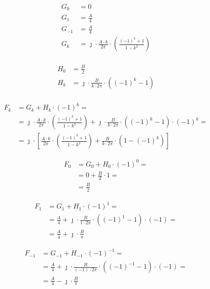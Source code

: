 \begin{task}
\begin{align*}
G_0&=0\\
G_1&=\frac{A}{4}\\
G_{-1}&=\frac{A}{4}\\
G_k&=\jmath \cdot \frac{A \cdot k}{2\pi} \cdot \left( \frac{ (-1)^{k}  + 1}{1 -k^2} \right)\\
\end{align*}

\begin{align*}
H_0&=\frac{B}{2}\\
H_k&=\jmath \cdot \frac{B}{k\cdot 2 \pi}\cdot \left( (-1)^{k} -1 \right)\\
\end{align*}


\begin{align*}
F_k&=G_k+H_k \cdot (-1)^k = \\
&= \jmath \cdot \frac{A \cdot k}{2\pi} \cdot \left( \frac{ (-1)^{k}  + 1}{1 -k^2} \right) + \jmath \cdot \frac{B}{k\cdot 2 \pi}\cdot \left( (-1)^{k} -1 \right) \cdot (-1)^k=\\
&= \jmath \cdot \left[\frac{A \cdot k}{2\pi} \cdot \left( \frac{ (-1)^{k}  + 1}{1 -k^2} \right) + \frac{B}{k\cdot 2 \pi}\cdot \left( 1 - (-1)^{k}\right)\right]
\end{align*}


\begin{align*}
F_0&=G_0 + H_0 \cdot (-1)^0=\\
 &= 0 + \frac{B}{2} \cdot 1=\\
 &= \frac{B}{2}
\end{align*}


\begin{align*}
F_1&=G_1 + H_1 \cdot (-1)^1 =\\
&= \frac{A}{4} + \jmath \cdot \frac{B}{1\cdot 2 \pi}\cdot \left( (-1)^{1} -1 \right) \cdot (-1) =\\
&= \frac{A}{4} + \jmath \cdot \frac{B}{\pi}
\end{align*}

\begin{align*}
F_{-1}&= G_{-1} + H_{-1}\cdot (-1)^{-1} =\\
&= \frac{A}{4} + \jmath \cdot \frac{B}{(-1)\cdot 2 \pi}\cdot \left( (-1)^{-1} -1 \right) \cdot (-1) =\\
&= \frac{A}{4} - \jmath \cdot \frac{B}{\pi}
\end{align*}


\end{task}
